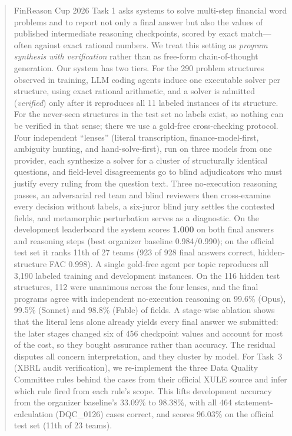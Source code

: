 \documentclass[conference]{IEEEtran}
\begin{document}
\begin{abstract}
FinReason Cup 2026 Task 1 asks systems to solve multi-step financial word problems and to report not only a final
answer but also the values of published intermediate reasoning checkpoints, scored by exact match---often against
exact rational numbers. We treat this setting as \emph{program synthesis with verification}
rather than as free-form chain-of-thought generation. Our system has two tiers.
For the 290 problem structures observed in training, LLM coding agents induce one executable solver per structure,
using exact rational arithmetic, and a solver is admitted (\emph{verified}) only after it reproduces all 11 labeled
instances of its structure. For the never-seen structures in the test set no labels exist, so nothing can be verified
in that sense; there we use a gold-free cross-checking protocol. Four independent
``lenses'' (literal transcription, finance-model-first, ambiguity hunting, and hand-solve-first), run on
three models from one provider, each synthesize a solver for a cluster of structurally identical questions, and
field-level disagreements go to blind adjudicators who must justify every ruling from the question
text. Three no-execution reasoning passes, an adversarial red team and blind reviewers then cross-examine every
decision without labels, a six-juror blind jury settles the contested fields, and metamorphic perturbation
serves as a diagnostic. On the development leaderboard the
system scores \textbf{1.000} on both final answers and reasoning steps (best organizer baseline 0.984/0.990); on the
official test set it ranks 11th of 27 teams (923 of 928 final answers correct, hidden-structure FAC 0.998).
A single gold-free agent per topic reproduces all 3{,}190 labeled training and
development instances. On the 116 hidden test structures, 112 were unanimous across the four lenses,
and the final programs agree with independent no-execution reasoning on 99.6\% (Opus), 99.5\% (Sonnet) and 98.8\% (Fable) of fields.
A stage-wise ablation shows that the literal lens alone already yields every final answer we submitted: the later
stages changed six of 456 checkpoint values and account for most of the cost, so they bought assurance rather than accuracy.
The residual disputes all concern interpretation, and they cluster by model. For Task~3 (XBRL audit
verification), we re-implement the three Data Quality Committee rules behind the cases from their official XULE source
and infer which rule fired from each rule's scope. This lifts development accuracy from the organizer baseline's
33.09\% to 98.38\%, with all 464 statement-calculation (DQC\_0126) cases correct, and scores 96.03\% on the official
test set (11th of 23 teams).
\end{abstract}
\end{document}
